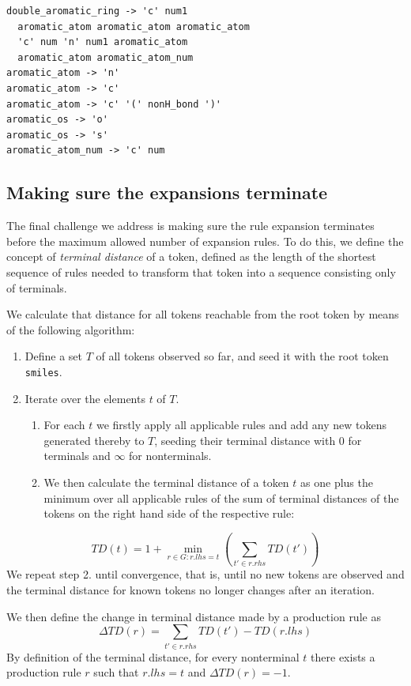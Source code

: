 \documentclass{article}
\begin{document}
{\footnotesize \begin{verbatim}
double_aromatic_ring -> 'c' num1 
  aromatic_atom aromatic_atom aromatic_atom
  'c' num 'n' num1 aromatic_atom 
  aromatic_atom aromatic_atom_num
aromatic_atom -> 'n'
aromatic_atom -> 'c'
aromatic_atom -> 'c' '(' nonH_bond ')'
aromatic_os -> 'o'
aromatic_os -> 's'
aromatic_atom_num -> 'c' num
\end{verbatim}}
\subsection{Making sure the expansions terminate}
The final challenge we address is making sure the rule expansion terminates before the maximum allowed number of expansion rules. To do this, we define the concept of \emph{terminal distance} of a token, defined as the length of the shortest sequence of rules needed to transform that token into a sequence consisting only of terminals. 

We calculate that distance for all tokens reachable from the root token by means of the following algorithm: 
\begin{enumerate}
	\item Define a set $T$ of all tokens observed so far, and seed it with the root token \verb+smiles+. 
	\item Iterate over the elements $t$ of $T$. 
	\begin{enumerate}
		\item For each $t$ we firstly apply all applicable rules and add any new tokens generated thereby to $T$, seeding their terminal distance with 0 for terminals and $\infty$ for nonterminals.
		\item We then calculate the terminal distance of a token $t$ as one plus the minimum over all applicable rules of the sum of terminal distances of the tokens on the right hand side of the respective rule:
	
	\end{enumerate}
\end{enumerate}
	\begin{equation}\label{eq:td}
TD(t)=1 + \min_{r \in G: r.lhs = t}\left(\sum_{t' \in r.rhs} TD(t') \right)
\end{equation}
We repeat step 2. until convergence, that is, until no new tokens are observed and the terminal distance for known tokens no longer changes after an iteration.

We then define the change in terminal distance made by a production rule as 
\begin{equation}\label{eq:dtd}
\Delta TD(r) =  \sum_{t' \in r.rhs} TD(t') - TD(r.lhs)
\end{equation}
By definition of the terminal distance, for every nonterminal $t$ there exists a production rule $r$ such that $r.lhs = t $ and $\Delta TD(r) = -1$.
\end{document}
